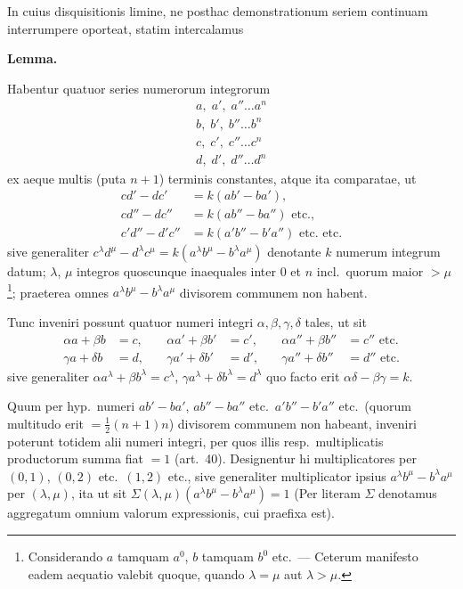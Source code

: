 \documentclass[12pt,a4paper]{article}
\theoremstyle{plain}
\theoremstyle{definition}
\theoremstyle{remark}
\begin{document}
In cuius disquisitionis limine, ne posthac demonstrationum seriem continuam interrumpere oporteat, statim intercalamus

\begin{center}
\textbf{Lemma.}
\end{center}

Habentur quatuor series numerorum integrorum
\begin{align*}
a,\; a',\; a''\ldots a^n\\
b,\; b',\; b''\ldots b^n\\
c,\; c',\; c''\ldots c^n\\
d,\; d',\; d''\ldots d^n
\end{align*}
ex aeque multis (puta $n+1$) terminis constantes, atque ita comparatae, ut
\begin{align*}
cd'-dc'&=k(ab'-ba'),\\
cd''-dc''&=k(ab''-ba'')\text{ etc.},\\
c'd''-d'c''&=k(a'b''-b'a'')\text{ etc. etc.}
\end{align*}
sive generaliter $c^\lambda d^\mu-d^\lambda c^\mu=k(a^\lambda b^\mu-b^\lambda a^\mu)$ denotante $k$ numerum integrum datum; $\lambda$, $\mu$ integros quoscunque inaequales inter $0$ et $n$ incl.\ quorum maior $>\mu$\footnote{Considerando $a$ tamquam $a^0$, $b$ tamquam $b^0$ etc.\ --- Ceterum manifesto eadem aequatio valebit quoque, quando $\lambda=\mu$ aut $\lambda>\mu$.}; praeterea omnes $a^\lambda b^\mu-b^\lambda a^\mu$ divisorem communem non habent.

Tunc inveniri possunt quatuor numeri integri $\alpha,\beta,\gamma,\delta$ tales, ut sit
\begin{align*}
\alpha a+\beta b &= c,\quad &\alpha a'+\beta b' &= c',\quad &\alpha a''+\beta b'' &= c''\text{ etc.}\\
\gamma a+\delta b &= d,\quad &\gamma a'+\delta b' &= d',\quad &\gamma a''+\delta b'' &= d''\text{ etc.}
\end{align*}
sive generaliter $\alpha a^\lambda+\beta b^\lambda=c^\lambda$, $\gamma a^\lambda+\delta b^\lambda=d^\lambda$ quo facto erit $\alpha\delta-\beta\gamma=k$.

Quum per hyp.\ numeri $ab'-ba'$, $ab''-ba''$ etc.\ $a'b''-b'a''$ etc.\ (quorum multitudo erit $=\frac{1}{2}(n+1)n$) divisorem communem non habeant, inveniri poterunt totidem alii numeri integri, per quos illis resp.\ multiplicatis productorum summa fiat $=1$ (art.~40). Designentur hi multiplicatores per $(0,1)$, $(0,2)$ etc.\ $(1,2)$ etc., sive generaliter multiplicator ipsius $a^\lambda b^\mu-b^\lambda a^\mu$ per $(\lambda,\mu)$, ita ut sit $\Sigma(\lambda,\mu)(a^\lambda b^\mu-b^\lambda a^\mu)=1$ (Per literam $\Sigma$ denotamus aggregatum omnium valorum expressionis, cui praefixa est).
\end{document}
